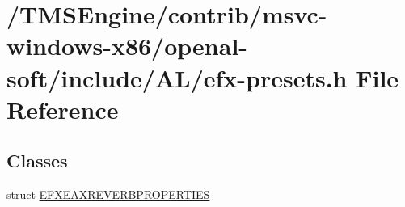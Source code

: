 \hypertarget{efx-presets_8h}{}\section{/\+T\+M\+S\+Engine/contrib/msvc-\/windows-\/x86/openal-\/soft/include/\+A\+L/efx-\/presets.h File Reference}
\label{efx-presets_8h}
\subsection*{Classes}
\begin{DoxyCompactItemize}
\item 
struct \hyperlink{struct_e_f_x_e_a_x_r_e_v_e_r_b_p_r_o_p_e_r_t_i_e_s}{E\+F\+X\+E\+A\+X\+R\+E\+V\+E\+R\+B\+P\+R\+O\+P\+E\+R\+T\+I\+ES}
\end{DoxyCompactItemize}
